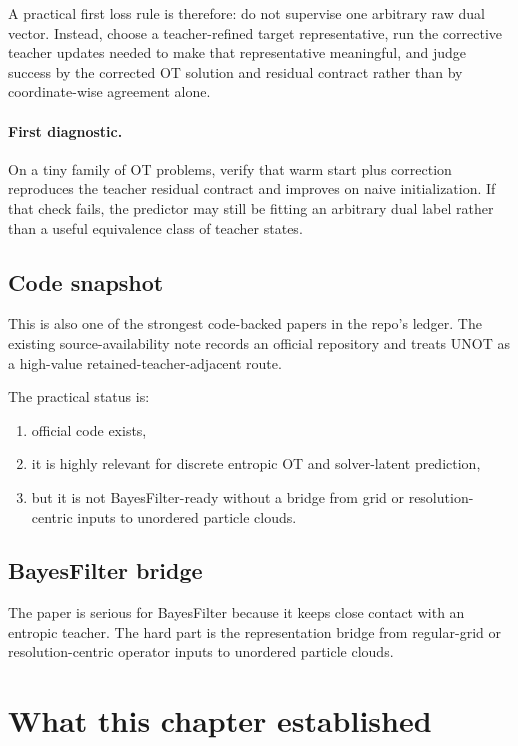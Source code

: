 \documentclass[11pt]{report}
\begin{document}
A practical first loss rule is therefore: do not supervise one arbitrary raw dual
vector.  Instead, choose a teacher-refined target representative, run the corrective
teacher updates needed to make that representative meaningful, and judge success by the
corrected OT solution and residual contract rather than by coordinate-wise agreement
alone.

\paragraph{First diagnostic.}
On a tiny family of OT problems, verify that warm start plus correction reproduces the
teacher residual contract and improves on naive initialization.  If that check fails, the
predictor may still be fitting an arbitrary dual label rather than a useful equivalence
class of teacher states.

\subsection*{Code snapshot}

This is also one of the strongest code-backed papers in the repo's ledger.  The
existing source-availability note records an official repository and treats UNOT as a
high-value retained-teacher-adjacent route.

The practical status is:
\begin{enumerate}[label=(\roman*)]
  \item official code exists,
  \item it is highly relevant for discrete entropic OT and solver-latent prediction,
  \item but it is not BayesFilter-ready without a bridge from grid or resolution-centric inputs to unordered particle clouds.
\end{enumerate}

\subsection*{BayesFilter bridge}

The paper is serious for BayesFilter because it keeps close contact with an
entropic teacher.  The hard part is the representation bridge from regular-grid or
resolution-centric operator inputs to unordered particle clouds.

\section{What this chapter established}
\end{document}
